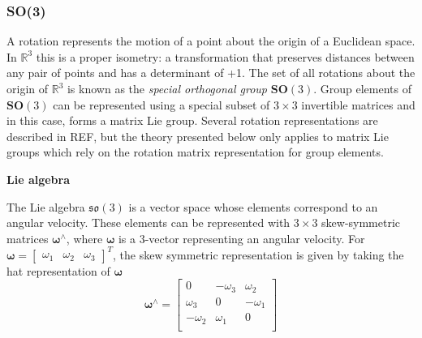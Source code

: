 	\subsubsection{\textbf{SO}(3)}	
		A rotation represents the motion of a point about the origin of a Euclidean space. In $\mathbb{R}^3$ this is a proper isometry: a transformation that preserves distances between any pair of points and has a determinant of +1. The set of all rotations about the origin of $\mathbb{R}^3$ is known as the \textit{special orthogonal group} $\textbf{SO}(3)$.
		Group elements of $\textbf{SO}(3)$ can be represented using a special subset of $3 \times 3$ invertible matrices and in this case, forms a matrix Lie group. Several rotation representations are described in REF, but the theory presented below only applies to matrix Lie groups which rely on the rotation matrix representation for group elements.
		
		\textbf{Lie algebra}\\
		\begin{comment}
			The Lie algebra $\mathfrak{so}(3)$ is a vector space whose elements correspond to an angular velocity. These elements can be represented with $3 \times 3$ skew-symmetric matrices $[\bm{\omega}]_{\times}$, where $\bm{\omega}$ is a 3-vector representing an angular velocity. For
			$\bm{\omega} = 
			\begin{bmatrix}
				\omega_1 & \omega_2 & \omega_3
			\end{bmatrix}^T$, the cross product matrix representation is defined as
			\begin{equation}
				[\bm{\omega}]_\times \stackrel{\Delta}{=} 
				\begin{bmatrix}
					0 			& -\omega_3 & \omega_2	\\
					\omega_3 	& 0 		& -\omega_1	\\
					-\omega_2 	& \omega_1 	& 0			\\
				\end{bmatrix}
			\end{equation}
		\end{comment}
		The Lie algebra $\mathfrak{so}(3)$ is a vector space whose elements correspond to an angular velocity. These elements can be represented with $3 \times 3$ skew-symmetric matrices $\bm{\omega}^{\wedge}$, where $\bm{\omega}$ is a 3-vector representing an angular velocity. For
		$\bm{\omega} = 
		\begin{bmatrix}
			\omega_1 & \omega_2 & \omega_3
		\end{bmatrix}^T$, the skew symmetric representation is given by taking the hat representation of $\bm{\omega}$
			\begin{equation}
				\bm{\omega}^{\wedge} =  
				\begin{bmatrix}
					0 			& -\omega_3 & \omega_2	\\
					\omega_3 	& 0 		& -\omega_1	\\
					-\omega_2 	& \omega_1 	& 0			\\
				\end{bmatrix}
			\end{equation}
		
